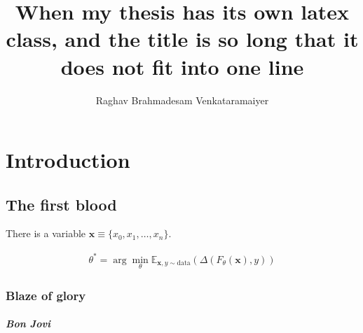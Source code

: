 \documentclass{iitkthesis}
\title{When my thesis has its own latex class, and the title is so
  long that it does not fit into one line}
\author{Raghav Brahmadesam Venkataramaiyer}
\begin{document}
\frontmatter
\maketitle
\certificate
\declaration

\abstract{\lipsum}

\mainmatter
\chapter{Introduction}

\lipsum[1-4]

\section{The first blood}

There is a variable $\mathbf{x} \equiv \{x_0,x_1,\ldots,x_n\}$.

\begin{align}
  \theta^* = \arg\min_\theta
             \mathbb{E}_{\mathbf{x},y\sim\mathrm{data}}
             \left(\Delta(F_\theta(\mathbf{x}),y)\right)
\end{align}

\lipsum[5-12]

\subsection{Blaze of glory}
\lipsum[14-28]

\paragraph{Bon Jovi}
\lipsum[29-31]
\end{document}
